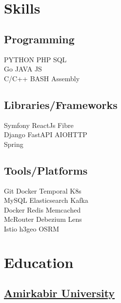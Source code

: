 \documentclass[]{plushcv}
\begin{document}
\begin{minipage}[t]{0.25\textwidth} 


\section{Skills}
\subsection{Programming}
\sectionsep
{}
PYTHON \textbullet{} PHP \textbullet{} SQL \\
\sectionsep
{}
Go \textbullet{}  JAVA  \textbullet{} JS \\
\sectionsep
{}
C/C++ \textbullet{}  BASH \textbullet{} Assembly
\sectionsep
\sectionsep
\subsection{Libraries/Frameworks}
\sectionsep
Symfony \textbullet{} ReactJs \textbullet{} Fibre \\
Django \textbullet{} FastAPI \textbullet{}AIOHTTP\\
Spring
\sectionsep
\sectionsep
\subsection{Tools/Platforms}
\sectionsep
Git \textbullet{} Docker \textbullet{} Temporal \textbullet K8s \\ MySQL  \textbullet{} Elasticsearch \textbullet{} Kafka \\ Docker \textbullet{} 
Redis \textbullet{} Memcached \\ McRouter \textbullet{} Debezium \textbullet{} Lens\\
Istio \textbullet{} h3geo \textbullet{} OSRM 

\sectionsep


\section{Education} 
\subsection{	\href{https://aut.ac.ir/en}{Amirkabir University}}


\end{minipage}
\end{document}
